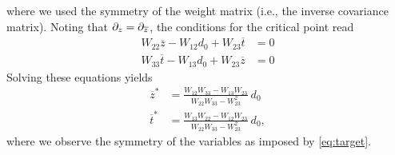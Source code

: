 \documentclass[12pt,a4paper]{scrarticle}
\begin{document}
where we used the symmetry of the weight matrix (i.e., the inverse covariance matrix). Noting that $\partial_{z} = \partial_{\overline{z}}$, the conditions for the critical point read
\begin{align*}
    W_{22} \overline{z} - W_{12} d_0 + W_{23} \overline{t} &= 0 \\
    W_{33} \overline{t} - W_{13} d_0 + W_{23} \overline{z} &= 0
\end{align*}
Solving these equations yields
\begin{align*}
    \overline{z}^* &= \frac{W_{12} W_{33} - W_{13} W_{23}}{W_{22} W_{33} - W_{23}^2} \ d_0 \\
    \overline{t}^* &= \frac{W_{13} W_{22} - W_{12} W_{23}}{W_{22} W_{33} - W_{23}^2} \ d_0,
\end{align*}
%
where we observe the symmetry of the variables as imposed by \autoref{eq:target}.
\end{document}

